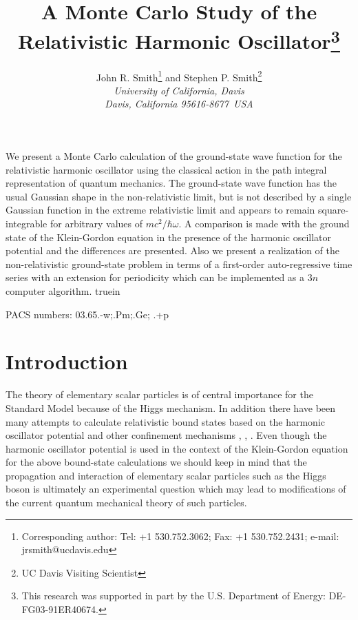 \documentclass[epsf]{article}
\begin{document}
\baselineskip 25pt
\begin{titlepage}
\baselineskip 25pt
\date{}
\title{A Monte Carlo Study of the Relativistic
Harmonic Oscillator\footnote{This 
research was supported in part by the U.S. Department
of Energy: DE-FG03-91ER40674.} }
\author{John R. Smith\footnote{Corresponding author: Tel: +1 530.752.3062; 
Fax: +1 530.752.2431; e-mail: jrsmith@ucdavis.edu} 
and Stephen P. Smith\footnote{UC Davis Visiting Scientist}  \\
{\em University of California, Davis}\\
{\em Davis, California 95616-8677\ USA}}
\baselineskip 25pt
We present a Monte Carlo calculation of the ground-state
wave function for the relativistic harmonic oscillator using the 
classical action in the path integral representation of quantum mechanics.
The ground-state wave function has the usual Gaussian shape in the 
non-relativistic limit, but is not described by a single Gaussian 
function in the extreme relativistic limit and appears to remain 
square-integrable for arbitrary values of $mc^2/\hbar\omega$.
A comparison is made with the ground state of the Klein-Gordon
equation in the presence of the harmonic oscillator potential and
the differences are presented.
Also we present a realization of the non-relativistic 
ground-state problem in terms
of a first-order auto-regressive time series with an extension for
periodicity which can be 
implemented as a $3n$ computer algorithm.
 truein
\centerline{PACS numbers: 03.65.-w;.Pm;.Ge;
.+p}
\end{titlepage}
%
\section{Introduction }
The theory of elementary sca\-lar particles is of central importance 
for the Standard Model because of the Higgs mechanism. In addition
there have been many attempts to calculate relativistic bound states 
based on the harmonic oscillator potential and other confinement
mechanisms \cite{bib:gunion1}, \cite{bib:gunion2}, \cite{bib:hey}.
Even though the harmonic oscillator potential is used 
in the context of the Klein-Gordon equation 
for the above bound-state calculations we
should keep in mind that the propagation and interaction of 
elementary sca\-lar particles such as the 
Higgs boson is ultimately an experimental question which may lead to 
modifications of the current quantum mechanical theory of such particles.
\end{document}
